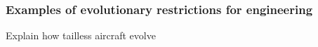 \documentclass{beamer}
\begin{document}


\begin{frame}
\frametitle{Examples of evolutionary restrictions for engineering}

Explain how tailless aircraft evolve

\end{frame}

\end{document}

